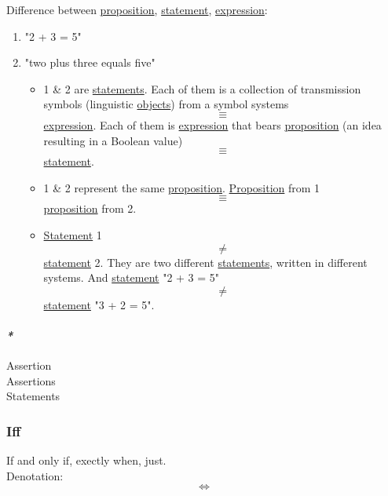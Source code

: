 \documentclass[11pt]{article}
\begin{document}
Difference between \hyperref[org1e068ed]{proposition}, \hyperref[org36313c0]{statement}, \hyperref[org9021dd7]{expression}:\\
\begin{enumerate}
\item "2 + 3 = 5"\\
\item "two plus three equals five"\\

\begin{itemize}
\item 1 \& 2 are \hyperref[org0c99cef]{statements}. Each of them is a collection of transmission symbols (linguistic \hyperref[org363acc2]{objects}) from a symbol systems $$ \equiv $$ \hyperref[org9021dd7]{expression}. Each of them is \hyperref[org9021dd7]{expression} that bears \hyperref[org1e068ed]{proposition} (an idea resulting in a Boolean value) $$ \equiv $$ \hyperref[org36313c0]{statement}.\\

\item 1 \& 2 represent the same \hyperref[org1e068ed]{proposition}. \hyperref[org1e068ed]{Proposition} from 1 $$ \equiv $$ \hyperref[org1e068ed]{proposition} from 2.\\

\item \hyperref[org36313c0]{Statement} 1 $$ \ne $$ \hyperref[org36313c0]{statement} 2. They are two different \hyperref[org0c99cef]{statements}, written in different systems. And \hyperref[org36313c0]{statement} "2 + 3 = 5" $$ \ne $$ \hyperref[org36313c0]{statement} "3 + 2 = 5".\\
\end{itemize}
\end{enumerate}

\paragraph{\emph{*}}
\label{sec:orge1a60ad}

\label{orgec191ff}Assertion\\
\label{org49a769a}Assertions\\
\label{org0c99cef}Statements\\

\subsubsection{\label{org1d6dc51}Iff}
\label{sec:org74c46b1}
If and only if, exectly when, just.\\
Denotation:\\
$$ \iff $$\\
\end{document}

